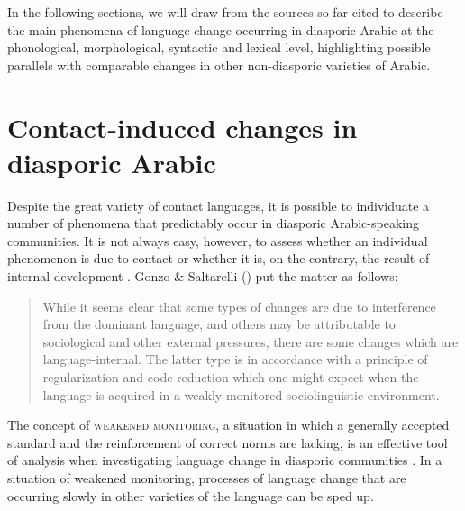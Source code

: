 \documentclass[output=paper]{langsci/langscibook}
\begin{document}
In the following sections, we will draw from the sources so far cited to describe the main phenomena of language change occurring in diasporic Arabic at the phonological, morphological, syntactic and lexical level, highlighting possible parallels with comparable changes in other non-diasporic varieties of Arabic.

\section{Contact-induced changes in diasporic Arabic}

Despite the great variety of contact languages, it is possible to individuate a number of phenomena that predictably occur in diasporic Arabic-speaking communities. It is not always easy, however, to assess whether an individual phenomenon is due to contact or whether it is, on the contrary, the result of internal development \citep[377]{Romaine1989}. Gonzo \& Saltarelli (\citeyear[177]{GonzoSaltarelli1977}) put the matter as follows:

\begin{quote}While it seems clear that some types of changes are due to interference from the dominant language, and others may be attributable to sociological and other external pressures, there are some changes which are language-internal. The latter type is in accordance with a principle of regularization and code reduction which one might expect when the language is acquired in a weakly monitored sociolinguistic environment.\end{quote}

The concept of \textsc{weakened} \textsc{monitoring}, a situation in which a generally accepted standard and the reinforcement of correct norms are lacking, is an effective tool of analysis when investigating language change in diasporic communities \citep{GonzoSaltarelli1977,GonzoSaltarelli1983}. In a situation of weakened monitoring, processes of language change that are occurring slowly in other varieties of the language can be sped up.
\end{document}
